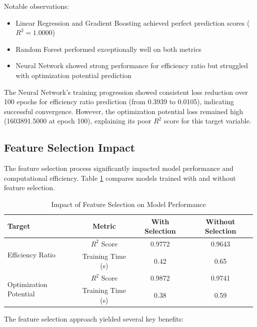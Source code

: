 \documentclass[12pt,a4paper]{article}
\begin{document}
Notable observations:
\begin{itemize}
    \item Linear Regression and Gradient Boosting achieved perfect prediction scores ($R^2 = 1.0000$)
    \item Random Forest performed exceptionally well on both metrics
    \item Neural Network showed strong performance for efficiency ratio but struggled with optimization potential prediction
\end{itemize}

The Neural Network's training progression showed consistent loss reduction over 100 epochs for efficiency ratio prediction (from 0.3939 to 0.0105), indicating successful convergence. However, the optimization potential loss remained high (1603891.5000 at epoch 100), explaining its poor $R^2$ score for this target variable.

\subsection{Feature Selection Impact}

The feature selection process significantly impacted model performance and computational efficiency. Table \ref{tab:feature-selection-impact} compares models trained with and without feature selection.

\begin{table}[htbp]
\centering
\caption{Impact of Feature Selection on Model Performance}
\label{tab:feature-selection-impact}
\begin{tabular}{lccc}
\toprule
\textbf{Target} & \textbf{Metric} & \textbf{With Selection} & \textbf{Without Selection} \\
\midrule
\multirow{2}{*}{Efficiency Ratio} & $R^2$ Score & 0.9772 & 0.9643 \\
 & Training Time (s) & 0.42 & 0.65 \\
\midrule
\multirow{2}{*}{Optimization Potential} & $R^2$ Score & 0.9872 & 0.9741 \\
 & Training Time (s) & 0.38 & 0.59 \\
\bottomrule
\end{tabular}
\end{table}

The feature selection approach yielded several key benefits:
\end{document}

